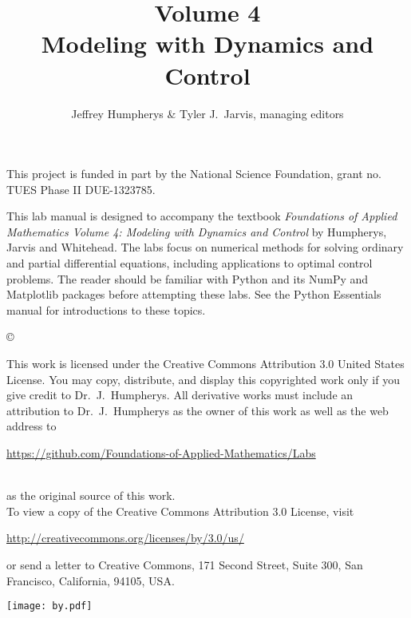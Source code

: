 \documentclass[opener-c,labs,green,nociteref]{HJnewsiambook}
\title{Volume 4\\ Modeling with Dynamics and Control}
\author{Jeffrey Humpherys \& Tyler J.~Jarvis, managing editors}
\begin{document}

\thispagestyle{empty} %
\maketitle
\thispagestyle{empty}
\frontmatter


This project is funded in part by the National Science Foundation, grant no. TUES Phase II DUE-1323785.

\begin{thepreface} %

This lab manual is designed to accompany the textbook \emph{Foundations of Applied Mathematics Volume 4: Modeling with Dynamics and Control} by Humpherys, Jarvis and Whitehead.
The labs focus on numerical methods for solving ordinary and partial differential equations, including applications to optimal control problems.
The reader should be familiar with Python \cite{vanrossum2010python} and its NumPy \cite{oliphant2006guide,ascher2001numerical,oliphant2007python} and Matplotlib \cite{Hunter:2007} packages before attempting these labs.
See the Python Essentials manual for introductions to these topics.

\vfill
\copyright{This work is licensed under the Creative Commons Attribution 3.0 United States License.
You may copy, distribute, and display this copyrighted work only if you give credit to Dr.~J.~Humpherys.
All derivative works must include an attribution to Dr.~J.~Humpherys as the owner of this work as well as the web address to
\\
\centerline{\url{https://github.com/Foundations-of-Applied-Mathematics/Labs}}
\\
as the original source of this work.
\\
To view a copy of the Creative Commons Attribution 3.0 License, visit
\\
\centerline{\url{http://creativecommons.org/licenses/by/3.0/us/}}
or send a letter to Creative Commons, 171 Second Street, Suite 300, San Francisco, California, 94105, USA.}

\vfill
\centering\texttt{[image: by.pdf]}
\vfill
\end{thepreface}

\setcounter{tocdepth}{1}
\tableofcontents

\mainmatter %
\end{document}
